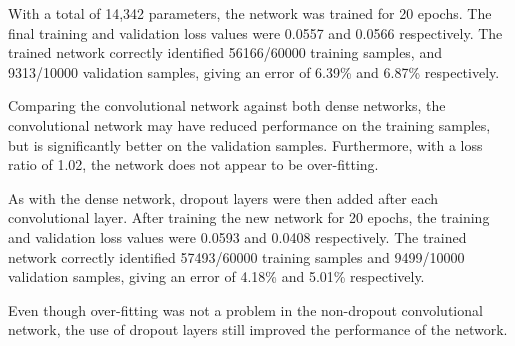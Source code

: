 With a total of 14,342 parameters, the network was trained for 20 epochs.
The final training and validation loss values were 0.0557 and 0.0566
respectively.
The trained network correctly identified 56166/60000 training samples, and
9313/10000 validation samples, giving an error of 6.39\% and 6.87\%
respectively.

Comparing the convolutional network against both dense networks, the
convolutional network may have reduced performance on the training samples, but
is significantly better on the validation samples.
Furthermore, with a loss ratio of 1.02, the network does not appear to be
over-fitting.

As with the dense network, dropout layers were then added after each
convolutional layer.
After training the new network for 20 epochs, the training and validation loss
values were 0.0593 and 0.0408 respectively.
The trained network correctly identified 57493/60000 training samples and
9499/10000 validation samples, giving an error of 4.18\% and 5.01\%
respectively.

Even though over-fitting was not a problem in the non-dropout convolutional
network, the use of dropout layers still improved the performance of the
network.





%



